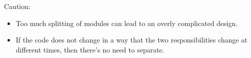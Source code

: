 \documentclass[xcolor=svgnames, handout]{beamer}
\begin{document}

\begin{frame}{\subsecname}

    \begin{minipage}{\columnwidth}
    \end{minipage}

\end{frame}


\begin{frame}{\subsecname}

    \begin{minipage}{\columnwidth}
    \end{minipage}

\end{frame}


\begin{frame}{\subsecname}

    \begin{minipage}{\columnwidth}
    \end{minipage}

\end{frame}


\begin{frame}{\subsecname}

    \begin{minipage}{\columnwidth}
    \end{minipage}

\end{frame}


\begin{frame}{\subsecname}
    Caution:
    \begin{itemize}
        \pause \item Too much splitting of modules can lead to an overly
            complicated design.
        \pause \item If the code does not change in a way that the two
            responsibilities change at different times, then there's no need to
            separate.
    \end{itemize}
\end{frame}
\end{document}
